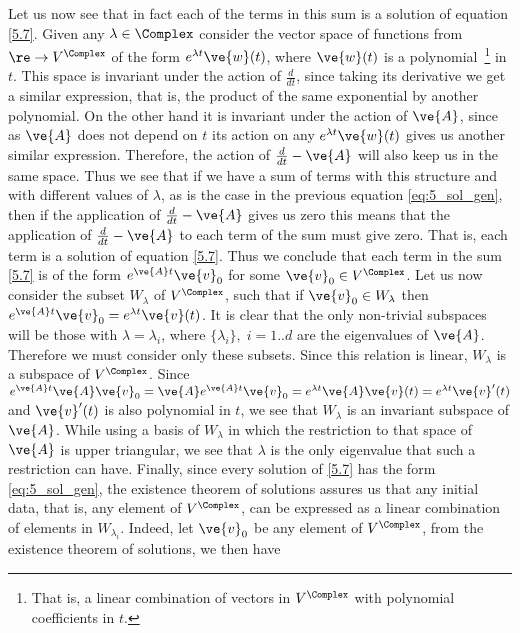 Let us now see that in fact each of the terms in this sum
is a solution of equation \ref{5.7}. 
Given any $\lambda \in \Complex$ consider the vector space
of functions from $\re \to V^{\Complex}$ of the form $e^{\lambda t} \ve{w}(t)$,
where $\ve{w}(t)$ is a polynomial~\footnote{That is, a linear combination
of vectors in $V^{\Complex}$ with polynomial coefficients in $t$.} in $t$. 
This space is invariant
under the action of $\frac{d}{dt}$, since taking its derivative we get
a similar expression, that is, the product of the same exponential by another
polynomial. 
%
On the other hand it is invariant under the action of
$\ve{A}$, since as $\ve{A}$ does not depend on $t$ its action on any
$e^{\lambda t} \ve{w}(t)$ gives us another similar expression.
%
Therefore, the action of $\frac{d}{dt} -\ve{A}$ will also keep us
in the same space.  
%
Thus we see that if we have a sum of terms with this structure
and with different values of $\lambda$, as is the case in the previous equation
\ref{eq:5_sol_gen}, then if the application of 
$\frac{d}{dt} -\ve{A}$ gives us zero this means that the application of 
$\frac{d}{dt} -\ve{A}$ to each term of
the sum must give zero. That is, each term is a solution of
equation \ref{5.7}.
Thus we conclude that each term in the
 sum \ref{5.7} is of the form $e^{\ve{A}t} \ve{v}_0$ for some
$\ve{v}_0 \in V^{\Complex}$.
%
Let us now consider the subset $W_{\lambda}$ of $V^{\Complex}$, such that
if $\ve{v}_0 \in W_{\lambda}$ then 
$e^{\ve{A}t} \ve{v}_0 = e^{\lambda t} \ve{v}(t)$.
It is clear that the only non-trivial subspaces will be those
with $\lambda = \lambda_i$, where $\{\lambda_i\},\;i=1..d$ are the eigenvalues
of $\ve{A}$. Therefore we must consider only these subsets.
% 
Since this relation is linear, $W_{\lambda}$ is a subspace of $V^{\Complex}$. 
Since 
$e^{\ve{A}t} \ve{A} \ve{v}_0 = \ve{A} e^{\ve{A}t} \ve{v}_0 
= e^{\lambda t} \ve{A} \ve{v}(t) = e^{\lambda t} \ve{v}'(t)$
and $\ve{v}'(t)$ is also polynomial in $t$, we see
that $W_{\lambda}$ is an invariant subspace of $\ve{A}$.
While using a basis of $W_{\lambda}$ in which the 
restriction to that space of $\ve{A}$ is upper triangular,
we see that $\lambda$ is the only eigenvalue that such a restriction
can have. Finally, since every solution of \ref{5.7} has
the form \ref{eq:5_sol_gen}, the existence theorem of solutions assures us
that any initial data,
that is, any element of $V^{\Complex}$, can be expressed
as a linear combination of elements in $W_{\lambda_i}$. 
Indeed, let $\ve{v}_0$ be any element of $V^{\Complex}$,
from the existence theorem of solutions, we then have 
